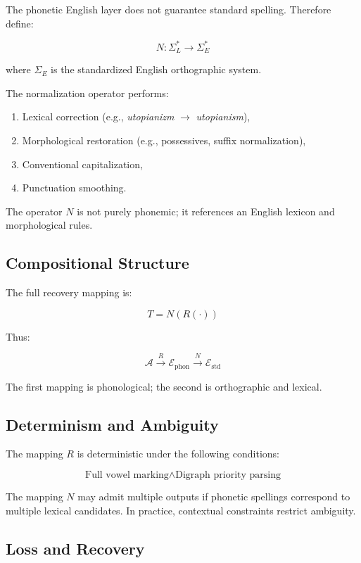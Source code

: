 \documentclass[12pt]{article}
\begin{document}
The phonetic English layer does not guarantee standard spelling. Therefore define:

\[
N : \Sigma_{L}^\ast \rightarrow \Sigma_{E}^\ast
\]

where $\Sigma_{E}$ is the standardized English orthographic system.

The normalization operator performs:

\begin{enumerate}
\item Lexical correction (e.g., \textit{utopianizm} $\rightarrow$ \textit{utopianism}),
\item Morphological restoration (e.g., possessives, suffix normalization),
\item Conventional capitalization,
\item Punctuation smoothing.
\end{enumerate}

The operator $N$ is not purely phonemic; it references an English lexicon and morphological rules.

\subsection{Compositional Structure}

The full recovery mapping is:

\[
T = N(R(\cdot))
\]

Thus:

\[
\mathcal{A} \xrightarrow{R} \mathcal{E}_{\text{phon}} \xrightarrow{N} \mathcal{E}_{\text{std}}
\]

The first mapping is phonological; the second is orthographic and lexical.

\subsection{Determinism and Ambiguity}

The mapping $R$ is deterministic under the following conditions:

\[
\text{Full vowel marking} \land \text{Digraph priority parsing}
\]

The mapping $N$ may admit multiple outputs if phonetic spellings correspond to multiple lexical candidates. In practice, contextual constraints restrict ambiguity.

\subsection{Loss and Recovery}
\end{document}
